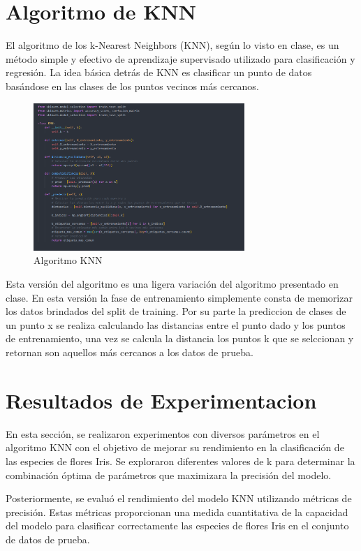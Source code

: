 \documentclass[conference]{IEEEtran}
\begin{document}
\section{Algoritmo de KNN}\label{AA}
El algoritmo de los k-Nearest Neighbors (KNN), según lo visto en clase, es un método simple y efectivo de aprendizaje supervisado utilizado para clasificación y regresión. La idea básica detrás de KNN es clasificar un punto de datos basándose en las clases de los puntos vecinos más cercanos.

\begin{figure}[ht]
  \includegraphics[width=80mm]{images/KNN.png}
  \caption{Algoritmo KNN}\label{fig6}
\end{figure}
\FloatBarrier

Esta versión del algoritmo es una ligera variación del algoritmo presentado en clase. En esta versión la fase de entrenamiento simplemente consta de memorizar los datos brindados del split de training. Por su parte la prediccion de clases de un punto x se realiza calculando las distancias entre el punto dado y los puntos de entrenamiento, una vez se calcula la distancia los puntos k que se selccionan y retornan son aquellos más cercanos a los datos de prueba.

\section{Resultados de Experimentacion}
En esta sección, se realizaron experimentos con diversos parámetros en el algoritmo KNN con el objetivo de mejorar su rendimiento en la clasificación de las especies de flores Iris. Se exploraron diferentes valores de k para determinar la combinación óptima de parámetros que maximizara la precisión del modelo.

Posteriormente, se evaluó el rendimiento del modelo KNN utilizando métricas de precisión. Estas métricas proporcionan una medida cuantitativa de la capacidad del modelo para clasificar correctamente las especies de flores Iris en el conjunto de datos de prueba. 
\end{document}
